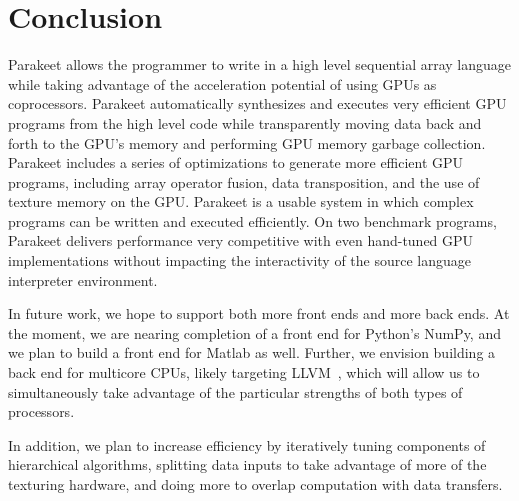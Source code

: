 \documentclass[10pt,twocolumn]{article}
\begin{document}
\section{Conclusion}
\label{Conclusion}

Parakeet allows the programmer to write in a high level sequential array language while taking advantage of the acceleration potential of using GPUs as coprocessors. Parakeet automatically synthesizes and executes very efficient GPU programs from the high level code while transparently moving data back and forth to the GPU's memory and performing GPU memory garbage collection. Parakeet includes a series of optimizations to generate more efficient GPU programs, including array operator fusion, data transposition, and the use of texture memory on the GPU.  Parakeet is a usable system in which complex programs can be written and executed efficiently.  On two benchmark programs, Parakeet delivers performance very competitive with even hand-tuned GPU implementations without impacting the interactivity of the source language interpreter environment.

In future work, we hope to support both more front ends and more back ends.  At the moment, we are nearing completion of a front end for Python's NumPy, and we plan to build a front end for Matlab as well.  Further, we envision building a back end for multicore CPUs, likely targeting LLVM~\cite{Latt02}, which will allow us to simultaneously take advantage of the particular strengths of both types of processors.

In addition, we plan to increase efficiency by iteratively tuning components of hierarchical algorithms, splitting data inputs to take advantage of more of the texturing hardware, and doing more to overlap computation with data transfers.

{\small

{}
}
\end{document}
